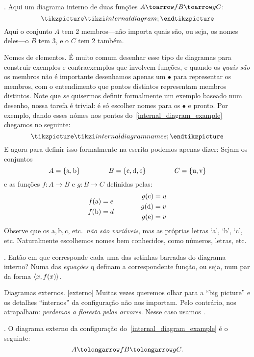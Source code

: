 \example.
\label{internal_diagram_example}%
Aqui um diagrama interno de duas funções $A \toarrow f B \toarrow g C$:
$$
\tikzpicture
\tikzi internaldiagram;
\endtikzpicture
$$
Aqui o conjunto $A$ tem 2 membros---não importa quais são, ou seja,
os nomes deles---o $B$ tem 3, e o $C$ tem 2 também.
\endexample

\note Nomes de elementos.
É muito comum desenhar esse tipo de diagramas para construir exemplos e
contraexemplos que involvem funções, e quando os \emph{quais são}
os membros não é importante desenhamos apenas um $\bullet$ para
representar os membros, com o entendimento que pontos distintos
representam membros distintos.
Note que \emph{se} quisermos definir formalmente um exemplo baseado num
desenho, nossa tarefa é trivial: é só escolher nomes para os $\bullet$
e pronto.
Por exemplo, dando esses nómes nos pontos
do~\ref{internal_diagram_example} chegamos no seguinte:
$$
\tikzpicture
\tikzi internaldiagramnames;
\endtikzpicture
$$
E agora para definir isso formalmente na escrita podemos apenas dizer:
Sejam os conjuntos
$$
A = \left\{\hbox{\rm a}, \hbox{\rm b}\right\} \hskip 4em\relax
B = \left\{\hbox{\rm c}, \hbox{\rm d}, \hbox{\rm e}\right\} \hskip 4em\relax
C = \left\{\hbox{\rm u}, \hbox{\rm v}\right\}
$$
e as funções $f : A\to B$ e $g : B\to C$ definidas pelas:
$$
\aligned
f(\mathrm a) &= e\\
f(\mathrm b) &= d
\endaligned
\qqqquad
\aligned
g(\mathrm c) &= u\\
g(\mathrm d) &= v\\
g(\mathrm e) &= v
\endaligned
$$
Observe que os $\mathrm a, \mathrm b, \mathrm c$, etc.~\emph{não são variáveis},
mas as próprias letras `a', `b', `c', etc.
Naturalmente escolhemos nomes bem conhecidos, como números, letras, etc.

\remark.
Então em que corresponde cada uma das setinhas barradas do diagrama interno?
Numa das \emph{equações} q definam a correspondente função,
ou seja, num par da forma $\left<x, f(x)\right>$.

\note Diagramas externos.
[externo]%
Muitas vezes queremos olhar para a ``big picture'' e os detalhes
``internos'' da configuração não nos importam.
Pelo contrário, nos atrapalham: \emph{perdemos a floresta pelas arvores}.
Nesse caso usamos .

\example.
\label{external_of_previous_example}%
O diagrama externo da configuração do~\ref{internal_diagram_example}
é o seguinte:
$$
A \tolongarrow f B \tolongarrow g C.
$$
\endexample


